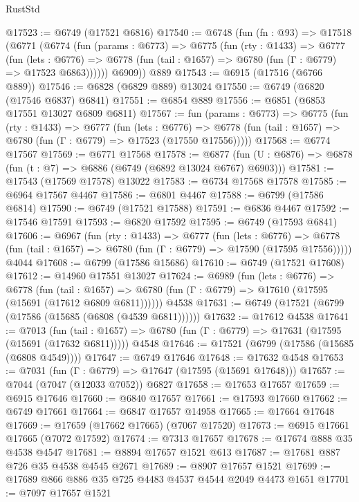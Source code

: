 \begin{lexlean}{RustStd}
\begin{coremodule}
@17523 := @6749 (@17521 @6816)
@17540 := @6748
    (fun (fn : @93) =>
    @17518
      (@6771
        (@6774
          (fun (params : @6773) =>
          @6775
            (fun (rty : @1433) =>
            @6777
              (fun (lets : @6776) =>
              @6778 (fun (tail : @1657) => @6780 (fun (Γ : @6779) => @17523 @6863))))))
        @6909))
    @889
@17543 := @6915 (@17516 (@6766 @889))
@17546 := @6828 (@6829 @889) @13024
@17550 := @6749 (@6820 (@17546 @6837) @6841)
@17551 := @6854 @889
@17556 := @6851 (@6853 @17551 @13027 @6809 @6811)
@17567 := fun (params : @6773) =>
  @6775
    (fun (rty : @1433) =>
    @6777
      (fun (lets : @6776) =>
      @6778 (fun (tail : @1657) => @6780 (fun (Γ : @6779) => @17523 (@17550 @17556)))))
@17568 := @6774 @17567
@17569 := @6771 @17568
@17578 := @6877
    (fun (U : @6876) => @6878 (fun (t : @7) => @6886 (@6749 (@6892 @13024 @6767) @6903)))
@17581 := @17543 (@17569 @17578) @13022
@17583 := @6734 @17568 @17578
@17585 := @6964 @17567 @4467
@17586 := @6801 @4467
@17588 := @6799 (@17586 @6814)
@17590 := @6749 (@17521 @17588)
@17591 := @6836 @4467
@17592 := @17546 @17591
@17593 := @6820 @17592
@17595 := @6749 (@17593 @6841)
@17606 := @6967
    (fun (rty : @1433) =>
    @6777
      (fun (lets : @6776) =>
      @6778 (fun (tail : @1657) => @6780 (fun (Γ : @6779) => @17590 (@17595 @17556)))))
    @4044
@17608 := @6799 (@17586 @15686)
@17610 := @6749 (@17521 @17608)
@17612 := @14960 @17551 @13027
@17624 := @6989
    (fun (lets : @6776) =>
    @6778
      (fun (tail : @1657) =>
      @6780 (fun (Γ : @6779) => @17610 (@17595 (@15691 (@17612 @6809 @6811))))))
    @4538
@17631 := @6749 (@17521 (@6799 (@17586 (@15685 (@6808 (@4539 @6811))))))
@17632 := @17612 @4538
@17641 := @7013
    (fun (tail : @1657) => @6780 (fun (Γ : @6779) => @17631 (@17595 (@15691 (@17632 @6811)))))
    @4548
@17646 := @17521 (@6799 (@17586 (@15685 (@6808 @4549))))
@17647 := @6749 @17646
@17648 := @17632 @4548
@17653 := @7031 (fun (Γ : @6779) => @17647 (@17595 (@15691 @17648)))
@17657 := @7044 (@7047 (@12033 @7052)) @6827
@17658 := @17653 @17657
@17659 := @6915 @17646
@17660 := @6840 @17657
@17661 := @17593 @17660
@17662 := @6749 @17661
@17664 := @6847 @17657 @14958
@17665 := @17664 @17648
@17669 := @17659 (@17662 @17665) (@7067 @17520)
@17673 := @6915 @17661 @17665 (@7072 @17592)
@17674 := @7313 @17657
@17678 := @17674 @888 @35 @4538 @4547
@17681 := @8894 @17657 @1521 @613
@17687 := @17681 @887 @726 @35 @4538 @4545 @2671
@17689 := @8907 @17657 @1521
@17699 := @17689 @866 @886 @35 @725 @4483 @4537 @4544 @2049 @4473 @1651
@17701 := @7097 @17657 @1521

\end{coremodule}
\end{lexlean}
